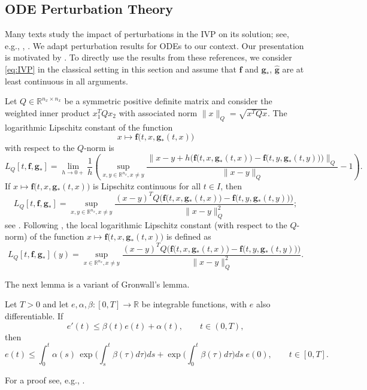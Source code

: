 \documentclass[onefignum,onetabnum]{siamart220329}
\numberwithin{equation}{section}
\newcommand {\real} {\mathbb{R}}
\newcommand{\bff}{\ensuremath{\mathbf{f}}} %
\newcommand{\bg}{\ensuremath{\mathbf{g}}} %
\begin{document}
%

\subsection{ODE Perturbation Theory} \label{sec:ODE_perturbation}
Many texts study the impact of perturbations in the IVP on its solution;
see, e.g.,  \cite[Sec.~I.10]{EHairer_SONorsett_GWanner_1993a}, \cite{GSoderlind_2006a}.
We adapt perturbation results for ODEs to our context. 
Our presentation is motivated by \cite{DWirtz_DCSorensen_BHaasdonk_2014a}.
To directly use the results from these references, we consider \cref{eq:IVP} in the classical 
setting in this section and assume that $\bff$ and $\bg_*$, $\widehat{\bg}$ are at least continuous in
all arguments. 

Let $Q \in \real^{n_x \times n_x}$ be a symmetric positive definite matrix and
consider the weighted inner product $x_1^T Q x_2$ with associated norm
$\| x \|_Q = \sqrt{x^T Q x}$.
The logarithmic Lipschitz constant of the function $$x \mapsto \bff\big(t, x, \bg _*(t,x)\big)$$ with respect to the $Q$-norm
is
\[
       L_Q[t,\bff,\bg_*] 
       = \lim_{h \rightarrow 0+} \frac{1}{h}
                     \left(  \sup_{x, y \in \real^{n_x}, x \not= y} \frac{ \Big\| x - y + h \Big( \bff\big(t, x, \bg _*(t,x)\big) - \bff\big(t, y, \bg _*(t,y)\big) \Big) \Big\|_Q }{ \| x - y \|_Q } - 1 \right).
\]
If $x \mapsto \bff\big(t, x, \bg _*(t,x)\big)$ is Lipschitz continuous for all $t \in I$, then
\begin{equation*}
       L_Q[t,\bff,\bg_*] =   \sup_{x, y \in \real^{n_x}, x \not= y} \frac{ ( x - y )^T Q \Big( \bff\big(t, x, \bg _*(t,x)\big) - \bff\big(t, y, \bg _*(t,y)\big) \Big) }{ \| x - y \|_Q^2 };
\end{equation*}
see \cite[Lemma~2.2]{DWirtz_DCSorensen_BHaasdonk_2014a}.
Following \cite[Def.~2.5]{DWirtz_DCSorensen_BHaasdonk_2014a}, the local logarithmic Lipschitz constant 
(with respect to the $Q$-norm) of the function $x \mapsto \bff\big(t, x, \bg _*(t,x)\big)$ is defined as
\begin{equation}    \label{eq:logarithmic-norm-local}
       L_Q[t,\bff,\bg_*](y) 
       =   \sup_{x \in \real^{n_x}, x \not= y} \frac{ ( x - y )^T Q \Big( \bff\big(t, x, \bg _*(t,x)\big) - \bff\big(t, y, \bg _*(t,y)\big) \Big) }{ \| x - y \|_Q^2 }.
\end{equation}


The next lemma is a variant of Gronwall's lemma.
\begin{lemma}   \label{lem:comparison}
  Let $T > 0$ and let $e, \alpha, \beta: [0, T] \rightarrow \real$ be integrable functions, with $e$ also differentiable.
  If
  \[
        e'(t) \le \beta(t) e(t) + \alpha(t), \qquad  t \in (0,T),
  \]
  then
  \[
         e(t)  \le \int_0^t  \alpha(s) \, \exp\big( \int_s^t  \beta(\tau)  d\tau \big) ds  +   \exp\big( \int_0^t  \beta(\tau)  d\tau \big) ds  \; e(0), \qquad t \in [0, T].
  \]
\end{lemma}
For a proof see, e.g., \cite[Lemma~2.6]{DWirtz_DCSorensen_BHaasdonk_2014a}.
\end{document}
